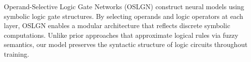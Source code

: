 Operand-Selective Logic Gate Networks (OSLGN) construct neural models using symbolic logic gate structures. By selecting operands and logic operators at each layer, OSLGN enables a modular architecture that reflects discrete symbolic computations. Unlike prior approaches that approximate logical rules via fuzzy semantics, our model preserves the syntactic structure of logic circuits throughout training.

